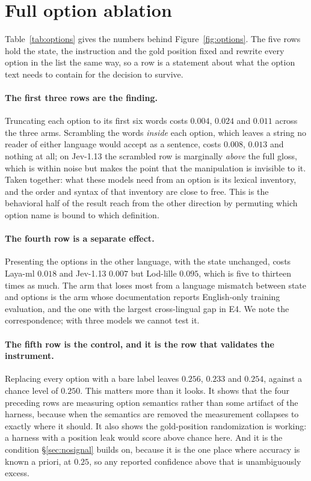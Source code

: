 \documentclass[11pt]{article}
\begin{document}
\section{Full option ablation}
\label{app:options}

Table~\ref{tab:options} gives the numbers behind Figure~\ref{fig:options}. The
five rows hold the state, the instruction and the gold position fixed and rewrite
every option in the list the same way, so a row is a statement about what the
option text needs to contain for the decision to survive.

\paragraph{The first three rows are the finding.} Truncating each option to its
first six words costs $0.004$, $0.024$ and $0.011$ across the three arms.
Scrambling the words \emph{inside} each option, which leaves a string no reader of
either language would accept as a sentence, costs $0.008$, $0.013$ and nothing at
all; on Jev-1.13 the scrambled row is marginally \emph{above} the full gloss, which
is within noise but makes the point that the manipulation is invisible to it. Taken
together: what these models need from an option is its lexical inventory, and the
order and syntax of that inventory are close to free. This is the behavioral half
of the result \citet{sun2026typesafe} reach from the other direction by permuting
which option name is bound to which definition.

\paragraph{The fourth row is a separate effect.} Presenting the options in the
other language, with the state unchanged, costs Laya-ml $0.018$ and Jev-1.13
$0.007$ but Lod-lille $0.095$, which is five to thirteen times as much. The arm
that loses most from a language mismatch between state and options is the arm whose
documentation reports English-only training evaluation, and the one with the
largest cross-lingual gap in E4. We note the correspondence; with three models we
cannot test it.

\paragraph{The fifth row is the control, and it is the row that validates the
instrument.} Replacing every option with a bare label leaves $0.256$, $0.233$ and
$0.254$, against a chance level of $0.250$. This matters more than it looks. It
shows that the four preceding rows are measuring option semantics rather than some
artifact of the harness, because when the semantics are removed the measurement
collapses to exactly where it should. It also shows the gold-position randomization
is working: a harness with a position leak would score above chance here. And it is
the condition \S\ref{sec:nosignal} builds on, because it is the one place where
accuracy is known a priori, at $0.25$, so any reported confidence above that is
unambiguously excess.
\end{document}

